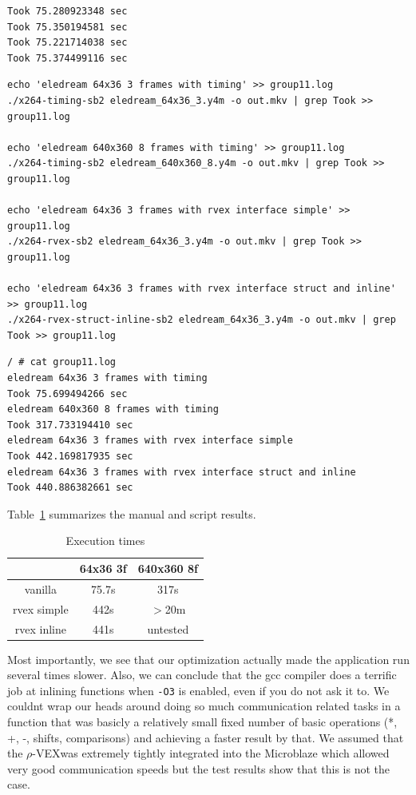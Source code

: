 \documentclass{article}
\newcommand{\rvex}{\ensuremath{\rho}-VEX}
\begin{document}
\begin{verbatim}
Took 75.280923348 sec
Took 75.350194581 sec
Took 75.221714038 sec
Took 75.374499116 sec
\end{verbatim}

\begin{lstlisting}[style=bash,caption=Test script,label=lst:testscript]
echo 'eledream 64x36 3 frames with timing' >> group11.log
./x264-timing-sb2 eledream_64x36_3.y4m -o out.mkv | grep Took >> group11.log

echo 'eledream 640x360 8 frames with timing' >> group11.log
./x264-timing-sb2 eledream_640x360_8.y4m -o out.mkv | grep Took >> group11.log

echo 'eledream 64x36 3 frames with rvex interface simple' >> group11.log
./x264-rvex-sb2 eledream_64x36_3.y4m -o out.mkv | grep Took >> group11.log

echo 'eledream 64x36 3 frames with rvex interface struct and inline' >> group11.log
./x264-rvex-struct-inline-sb2 eledream_64x36_3.y4m -o out.mkv | grep Took >> group11.log
\end{lstlisting}

\begin{lstlisting}[style=bash,caption=Test output,label=lst:testoutput]
/ # cat group11.log
eledream 64x36 3 frames with timing
Took 75.699494266 sec
eledream 640x360 8 frames with timing
Took 317.733194410 sec
eledream 64x36 3 frames with rvex interface simple
Took 442.169817935 sec
eledream 64x36 3 frames with rvex interface struct and inline
Took 440.886382661 sec
\end{lstlisting}

Table~\ref{tab:exe-times} summarizes the manual and script results.

\begin{table}[!h]
    \centering
    \caption{Execution times}
    \label{tab:exe-times}
    \begin{tabular}{|c|c|c|}
       \hline
                   & 64x36 3f & 640x360 8f \\ \hline
       vanilla     & 75.7s    & 317s       \\
       rvex simple & 442s     & $>$20m     \\
       rvex inline & 441s     & untested   \\
       \hline
    \end{tabular}
\end{table}

Most importantly, we see that our optimization actually made the application
run several times slower.  Also, we can conclude that the gcc compiler does a
terrific job at inlining functions when \texttt{-O3} is enabled, even if you do
not ask it to.  We couldnt wrap our heads around doing so much communication
related tasks in a function that was basicly a relatively small fixed number of
basic operations (*, +, -, shifts, comparisons) and achieving a faster result
by that.  We assumed that the \rvex was extremely tightly integrated into the
Microblaze which allowed very good communication speeds but the test results
show that this is not the case.
\end{document}
